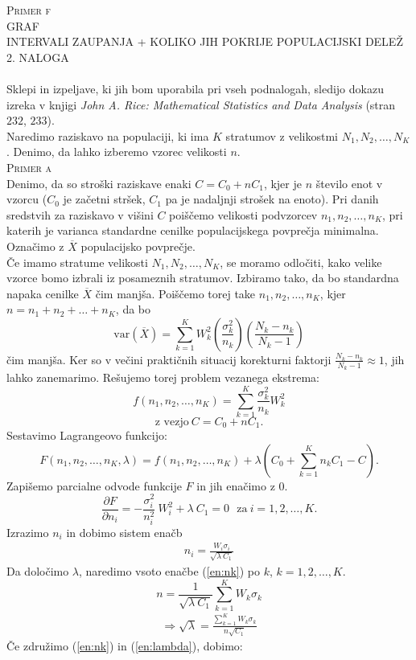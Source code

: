 \documentclass[a4paper,12pt]{article}
\begin{document}

\noindent
\textsc{Primer f}
\\
GRAF 
\\
INTERVALI ZAUPANJA + KOLIKO JIH POKRIJE POPULACIJSKI DELEŽ
\\


\noindent
\textsc{\large{2. NALOGA}}
\\
\\
Sklepi in izpeljave, ki jih bom uporabila pri vseh podnalogah, sledijo dokazu izreka v knjigi \textit{John A. Rice: Mathematical Statistics and Data Analysis} (stran $232$, $233$).
\\
Naredimo raziskavo na populaciji, ki ima $K$ stratumov z velikostmi $N_1, N_2, \ldots, N_K$. Denimo, da lahko izberemo vzorec velikosti $n$.
\\

\noindent
\textsc{Primer a}
\\
Denimo, da so stroški raziskave enaki $C = C_0 + n C_1$, kjer je $n$ število enot v vzorcu ($C_0$ je začetni stršek, $C_1$ pa je nadaljnji strošek na enoto). Pri danih sredstvih za raziskavo v višini $C$ poiščemo velikosti podvzorcev $n_1, n_2, \ldots, n_K$, pri katerih je varianca standardne cenilke populacijskega povprečja minimalna.
\\
Označimo z $\overline{X}$ populacijsko povprečje.
\\
Če imamo stratume velikosti $N_1, N_2, \ldots, N_K$, se moramo odločiti, kako velike vzorce bomo izbrali iz posameznih stratumov. Izbiramo tako, da bo standardna napaka cenilke $\overline{X}$ čim manjša. 
Poiščemo torej take $n_1, n_2, \ldots, n_K$, kjer $n = n_1 + n_2 + \ldots + n_K$, da bo $$ \text{var}(\overline{X}) = \sum_{k = 1}^{K} W_k ^ 2 \left( \frac{ \sigma_k^2}{n_k} \right) \left( \frac{N_k - n_k}{N_k - 1} \right) $$
čim manjša.
Ker so v večini praktičnih situacij korekturni faktorji $\frac{N_k - n_k}{N_k - 1} \approx 1$, jih lahko zanemarimo. Rešujemo torej problem vezanega ekstrema:
$$ f(n_1, n_2, \ldots, n_K) = \sum_{k = 1}^{K} \frac{\sigma_k^2}{n_k} W_k^2 $$
$$ \text{z vezjo} \  C = C_0 + nC_1.$$
Sestavimo Lagrangeovo funkcijo:
$$ F(n_1, n_2, \ldots, n_K, \lambda) = f(n_1, n_2, \ldots, n_K) + \lambda (C_0 + \sum_{k = 1}^{K} n_k C_1 - C). $$
Zapišemo parcialne odvode funkcije $F$ in jih enačimo z $0$.
$$ \frac{ \partial F}{\partial n_i} = - \frac{ \sigma_i^2}{n_i^2} \  W_i^2 + \lambda \ C_1 = 0 \ \ \ \text{za} \ i = 1, 2, \ldots, K. $$
Izrazimo $n_i$ in dobimo sistem enačb
\begin{align}\label{en:nk}
n_i = \frac{W_i \sigma_i}{ \sqrt{ \lambda \ C_1}}
\end{align}
Da določimo $\lambda$, naredimo vsoto enačbe (\ref{en:nk}) po $k$, $k = 1, 2, \ldots, K.$
$$ n = \frac{1}{\sqrt{\lambda \ C_1}} \sum_{k = 1}^{K} W_k \sigma_k $$
\begin{align}\label{en:lambda}
\Rightarrow \sqrt{\lambda} = \frac{\sum_{k = 1}^{K} W_k \sigma_k}{n \sqrt{C_1}}
\end{align}
Če združimo (\ref{en:nk}) in (\ref{en:lambda}), dobimo:
\end{document}

